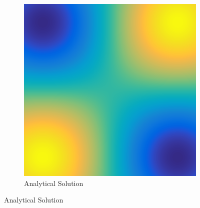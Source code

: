 \documentclass[../fem.tex]{subfile}
\begin{document}
\begin{figure}[htpb]
  \centering
  \begin{subfigure}{0.5\textwidth}
    \centering
    \includegraphics[width=0.8\linewidth]{figures/r1/func.png}
    \caption{Analytical Solution}
  \end{subfigure}


\end{figure}
\end{document}
